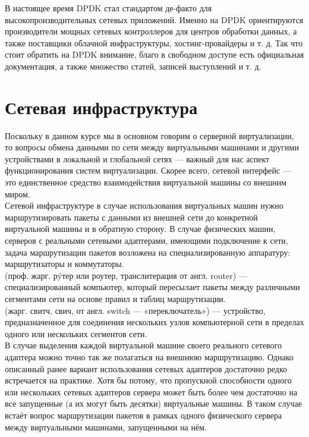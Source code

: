 \documentclass[14pt, a4paper]{article}
\begin{document}
В настоящее время DPDK стал стандартом де-факто для высокопроизводительных сетевых
приложений. Именно на DPDK ориентируются производители мощных сетевых контроллеров для
центров обработки данных, а также поставщики облачной инфраструктуры, хостинг-провайдеры и т. д.
Так что стоит обратить на DPDK внимание, благо в свободном доступе есть официальная
документация, а также множество статей, записей выступлений и т. д.

\section*{Сетевая инфраструктура} 

Поскольку в данном курсе мы в основном говорим о серверной виртуализации, то вопросы обмена
данными по сети между виртуальными машинами и другими устройствами в локальной и глобальной
сетях — важный для нас аспект функционирования систем виртуализации. Скорее всего, сетевой
интерфейс — это единственное средство взаимодействия виртуальной машины со внешним миром.\\

Сетевой инфраструктуре в случае использования виртуальных машин нужно маршрутизировать
пакеты с данными из внешней сети до конкретной виртуальной машины и в обратную сторону. В
случае физических машин, серверов с реальными сетевыми адаптерами, имеющими подключение к
сети, задача маршрутизации пакетов возложена на специализированную аппаратуру:
маршрутизаторы и коммутаторы.\\

\href{https://ru.wikipedia.org/wiki/Маршрутизатор}{} (проф. жарг. рýтер или роутер, транслитерация от англ. router) —
специализированный компьютер, который пересылает пакеты между различными сегментами сети на
основе правил и таблиц маршрутизации.\\

\href{https://ru.wikipedia.org/wiki/Сетевой_коммутатор}{} (жарг. свитч, свич, от англ. switch — «переключатель») — устройство,
предназначенное для соединения нескольких узлов компьютерной сети в пределах одного или
нескольких сегментов сети.\\

В случае выделения каждой виртуальной машине своего реального сетевого адаптера можно точно
так же полагаться на внешнюю маршрутизацию. Однако описанный ранее вариант использования
сетевых адаптеров достаточно редко встречается на практике. Хотя бы потому, что пропускной
способности одного или нескольких сетевых адаптеров сервера может быть более чем достаточно на
все запущенные (а их могут быть десятки) виртуальные машины. В таком случае встаёт вопрос
маршрутизации пакетов в рамках одного физического сервера между виртуальными машинами,
запущенными на нём.\\
\end{document}
